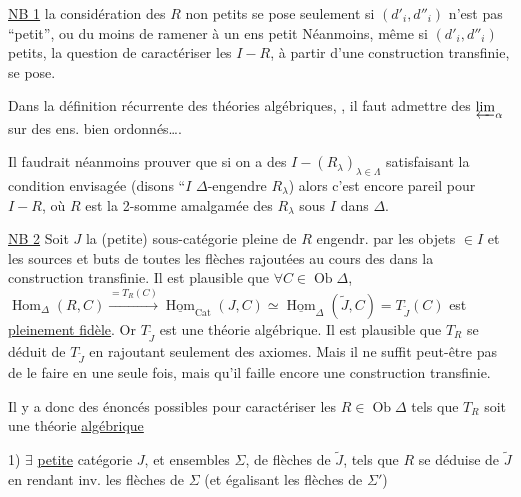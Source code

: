 \uline{NB 1}  la considération des $R$ non petits se pose seulement si $(d'_i,d''_i)$ n'est pas ``petit'', ou du moins de ramener à un ens petit  Néanmoins, même si $(d'_i,d''_i)$ petits, la question de caractériser les $I\mathbin{-}R$, à partir d'une construction transfinie, se pose.

Dans la définition récurrente des théories algébriques,  ,  il faut admettre des $\varprojlim_{\alpha}$ sur des ens. bien ordonnés\ldots.

Il faudrait néanmoins prouver que si on a des $I\mathbin{-}(R_\lambda)_{\lambda\in\Lambda}$ satisfaisant la condition envisagée (disons ``$I$ $\Delta$-engendre $R_\lambda$) alors c'est encore pareil pour $I\mathbin{-}R$, où $R$ est la 2-somme amalgamée des $R_\lambda$ sous $I$ dans $\Delta$.

\uline{NB 2} Soit $J$ la (petite) sous-catégorie pleine de $R$ engendr. par les objets $\in I$ et les  sources et buts de toutes les flèches rajoutées au cours des  dans la construction transfinie. Il est plausible que $\forall C\in\operatorname{Ob}\Delta$, $\operatorname{Hom}_\Delta(R,C)\overset{=T_R(C)}{\longrightarrow}\underline{\operatorname{Hom}}_{\mathrm{Cat}}(J,C)\simeq\underline{\operatorname{Hom}}_\Delta(\widetilde J,C)=T_{\widetilde J}(C)$ est \uline{pleinement fidèle}.  Or $T_{\widetilde J}$ est une théorie algébrique. Il est plausible  que  $T_R$ se déduit de $T_{\widetilde J}$  en rajoutant seulement des axiomes. Mais il ne suffit peut-être pas de le faire en une
seule fois, mais qu'il faille encore une construction transfinie.

Il y a donc des énoncés possibles pour caractériser les $R\in\operatorname{Ob}\Delta$ tels que $T_R$ soit une théorie \uline{algébrique}

1) $\exists$ \uline{petite} catégorie $J$, et ensembles $\Sigma$,  de flèches de $\widetilde J$,  tels que $R$ se déduise de $\widetilde J$ en rendant inv. les flèches de $\Sigma$ (et égalisant les  flèches de $\Sigma'$)

